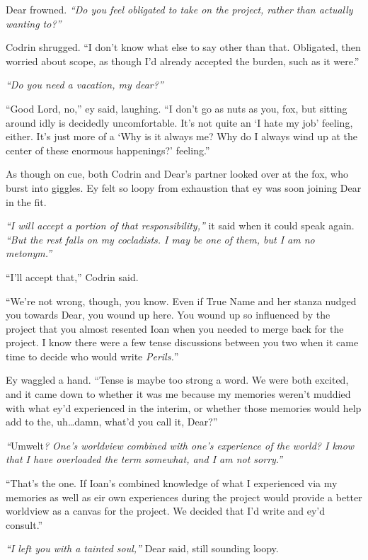 Dear frowned. \emph{``Do you feel obligated to take on the project, rather than actually wanting to?''}

Codrin shrugged. ``I don't know what else to say other than that. Obligated, then worried about scope, as though I'd already accepted the burden, such as it were.''

\emph{``Do you need a vacation, my dear?''}

``Good Lord, no,'' ey said, laughing. ``I don't go as nuts as you, fox, but sitting around idly is decidedly uncomfortable. It's not quite an `I hate my job' feeling, either. It's just more of a `Why is it always me? Why do I always wind up at the center of these enormous happenings?' feeling.''

As though on cue, both Codrin and Dear's partner looked over at the fox, who burst into giggles. Ey felt so loopy from exhaustion that ey was soon joining Dear in the fit.

\emph{``I will accept a portion of that responsibility,''} it said when it could speak again. \emph{``But the rest falls on my cocladists. I may be one of them, but I am no metonym.''}

``I'll accept that,'' Codrin said.

``We're not wrong, though, you know. Even if True Name and her stanza nudged you towards Dear, you wound up here. You wound up so influenced by the project that you almost resented Ioan when you needed to merge back for the project. I know there were a few tense discussions between you two when it came time to decide who would write \emph{Perils.}''

Ey waggled a hand. ``Tense is maybe too strong a word. We were both excited, and it came down to whether it was me because my memories weren't muddied with what ey'd experienced in the interim, or whether those memories would help add to the, uh\ldots damn, what'd you call it, Dear?''

\emph{``}Umwelt\emph{? One's worldview combined with one's experience of the world? I know that I have overloaded the term somewhat, and I am not sorry.''}

``That's the one. If Ioan's combined knowledge of what I experienced via my memories as well as eir own experiences during the project would provide a better worldview as a canvas for the project. We decided that I'd write and ey'd consult.''

\emph{``I left you with a tainted soul,''} Dear said, still sounding loopy.

